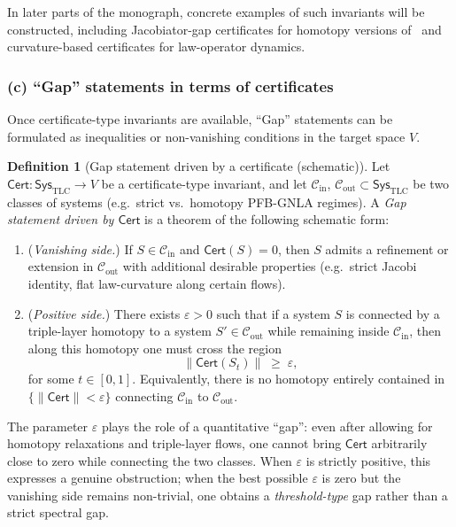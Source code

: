 \documentclass[11pt]{book}
\theoremstyle{plain}
\theoremstyle{definition}
\newtheorem{definition}[theorem]{Definition} \theoremstyle{remark}
\begin{document}
In later parts of the monograph, concrete examples of such invariants
will be constructed, including Jacobiator-gap certificates for homotopy
versions of \GAlgebra\ and curvature-based certificates for
law-operator dynamics.



\subsubsection*{(c) “Gap” statements in terms of certificates}

Once certificate-type invariants are available, “Gap” statements can be
formulated as inequalities or non-vanishing conditions in the target
space $V$.



\begin{definition}[Gap statement driven by a certificate (schematic)]
Let $\mathsf{Cert}:\mathsf{Sys}_{\mathrm{TLC}}\to V$ be a
  certificate-type invariant, and let $\mathcal{C}_{\mathrm{in}}$,
  $\mathcal{C}_{\mathrm{out}}\subset\mathsf{Sys}_{\mathrm{TLC}}$ be two
  classes of systems (e.g.\ strict vs.\ homotopy PFB-GNLA regimes). A
  \emph{Gap statement driven by $\mathsf{Cert}$} is a theorem of the
  following schematic form:

  \begin{enumerate}[label=\roman*)]
    \item (\emph{Vanishing side.})
          If $S\in\mathcal{C}_{\mathrm{in}}$ and
          $\mathsf{Cert}(S)=0$, then $S$ admits a refinement or
          extension in $\mathcal{C}_{\mathrm{out}}$ with additional
          desirable properties (e.g.\ strict Jacobi identity, flat
          law-curvature along certain flows).
    \item (\emph{Positive side.})
          There exists $\varepsilon>0$ such that if a system $S$ is
          connected by a triple-layer homotopy to a system
          $S'\in\mathcal{C}_{\mathrm{out}}$ while remaining inside
          $\mathcal{C}_{\mathrm{in}}$, then along this homotopy one
          must cross the region
          \[
             \|\mathsf{Cert}(S_t)\|\;\ge\;\varepsilon,
          \]
          for some $t\in[0,1]$. Equivalently, there is no homotopy
          entirely contained in $\{\|\mathsf{Cert}\|<\varepsilon\}$
          connecting $\mathcal{C}_{\mathrm{in}}$ to
          $\mathcal{C}_{\mathrm{out}}$.
  \end{enumerate}
\end{definition}

The parameter $\varepsilon$ plays the role of a quantitative “gap”:
even after allowing for homotopy relaxations and triple-layer flows,
  one cannot bring $\mathsf{Cert}$ arbitrarily close to zero while
  connecting the two classes. When $\varepsilon$ is strictly positive,
  this expresses a genuine obstruction; when the best possible
  $\varepsilon$ is zero but the vanishing side remains non-trivial, one
  obtains a \emph{threshold-type} gap rather than a strict spectral gap.
\end{document}
